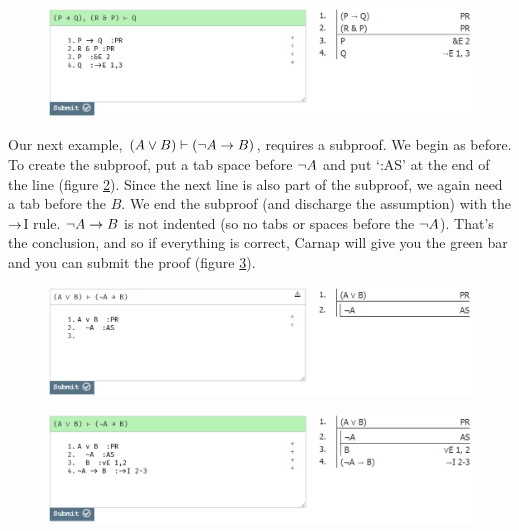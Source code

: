 \begin{figure}[h]
\includegraphics[width=13cm]{textbook--1c.PNG}
\caption{}
\label{fig:proof-1c}
\end{figure}

Our next example, $(A \vee B) \vdash ({\neg} A \rightarrow B)$, requires a subproof. We begin as before. To create the subproof, put a tab space before ${\neg} A$ and put `:AS' at the end of the line (figure \ref{fig:proof-2a}). Since the next line is also part of the subproof, we again need a tab before the $B$. We end the subproof (and discharge the assumption) with the $\rightarrow$I rule. ${\neg} A \rightarrow B$ is not indented (so no tabs or spaces before the ${\neg} A$). That's the conclusion, and so if everything is correct, Carnap will give you the green bar and you can submit the proof (figure \ref{fig:proof-2b}). 

\begin{figure}[h]
\includegraphics[width=13cm]{textbook--2a.PNG}
\caption{}
\label{fig:proof-2a}
\end{figure}

\begin{figure}[h]
\includegraphics[width=13cm]{textbook--2b.PNG}
\caption{}
\label{fig:proof-2b}
\end{figure}

